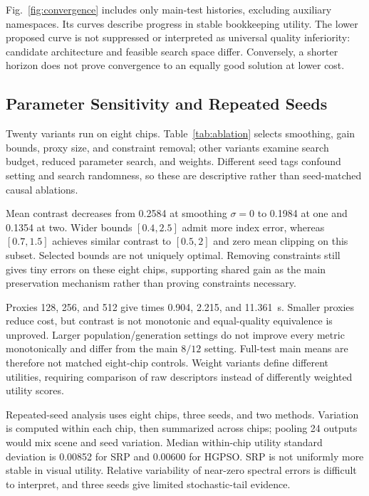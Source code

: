 \documentclass[conference]{IEEEtran}
\begin{document}
Fig.~\ref{fig:convergence} includes only main-test histories, excluding auxiliary namespaces. Its curves describe progress in stable bookkeeping utility. The lower proposed curve is not suppressed or interpreted as universal quality inferiority: candidate architecture and feasible search space differ. Conversely, a shorter horizon does not prove convergence to an equally good solution at lower cost.

\subsection{Parameter Sensitivity and Repeated Seeds}

Twenty variants run on eight chips. Table~\ref{tab:ablation} selects smoothing, gain bounds, proxy size, and constraint removal; other variants examine search budget, reduced parameter search, and weights. Different seed tags confound setting and search randomness, so these are descriptive rather than seed-matched causal ablations.

Mean contrast decreases from 0.2584 at smoothing $\sigma=0$ to 0.1984 at one and 0.1354 at two. Wider bounds $[0.4,2.5]$ admit more index error, whereas $[0.7,1.5]$ achieves similar contrast to $[0.5,2]$ and zero mean clipping on this subset. Selected bounds are not uniquely optimal. Removing constraints still gives tiny errors on these eight chips, supporting shared gain as the main preservation mechanism rather than proving constraints necessary.

Proxies 128, 256, and 512 give times 0.904, 2.215, and 11.361~s. Smaller proxies reduce cost, but contrast is not monotonic and equal-quality equivalence is unproved. Larger population/generation settings do not improve every metric monotonically and differ from the main $8/12$ setting. Full-test main means are therefore not matched eight-chip controls. Weight variants define different utilities, requiring comparison of raw descriptors instead of differently weighted utility scores.

Repeated-seed analysis uses eight chips, three seeds, and two methods. Variation is computed within each chip, then summarized across chips; pooling 24 outputs would mix scene and seed variation. Median within-chip utility standard deviation is 0.00852 for SRP and 0.00600 for HGPSO. SRP is not uniformly more stable in visual utility. Relative variability of near-zero spectral errors is difficult to interpret, and three seeds give limited stochastic-tail evidence.
\end{document}
